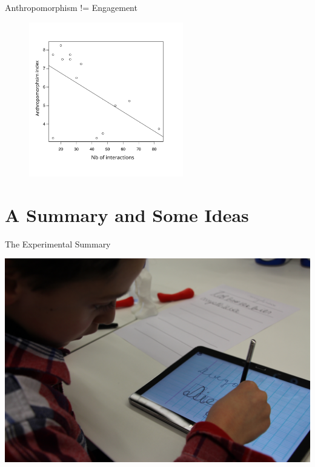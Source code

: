 \documentclass[compress]{beamer}
\begin{document}
{{{\begin{frame}{Anthropomorphism != Engagement}
\begin{figure}
    \hspace*{5cm}\includegraphics[width=0.6\textwidth]{ranger-interactions-vs-qualitative-score}
\end{figure}
\end{frame}
}



\section{A Summary and Some Ideas}

\begin{frame}{The Experimental Summary}

    \begin{multicols}{4}
        \includegraphics[width=\columnwidth]{diego-writing}


\end{multicols}
\end{frame}}}
\end{document}
